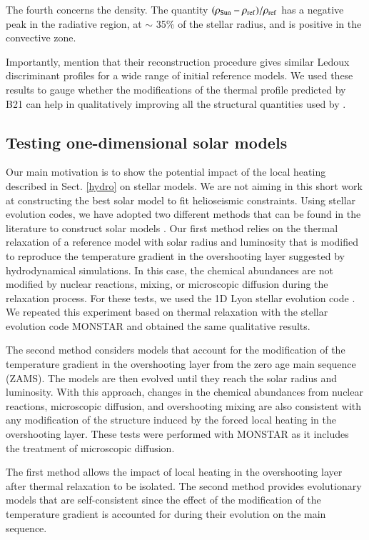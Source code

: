 \documentclass[traditabstract]{aa}
\newcommand{\3}{\ss}
\newcommand{\cp}{\citep}
\newcommand{\ct}{\citet}
\begin{document}
{The fourth concerns the density. The quantity $(\rho_{\rm Sun}-\rho_{\rm ref})/\rho_{\rm ref}$ has a negative peak in the radiative region, at $\sim$ 35\% of the stellar radius, and is positive in the convective zone. 

Importantly, \ct{buldgen20} mention that their reconstruction procedure gives  similar Ledoux discriminant profiles for a wide range of initial reference models. We used these results to gauge whether the modifications of the thermal profile  predicted by B21 can help in qualitatively improving all the structural quantities used by \ct{buldgen20}.


\subsection{Testing one-dimensional solar models}
\label{test1d}
Our main motivation is to show the potential  impact of the local heating 
described in Sect. \ref{hydro} on stellar models. We are not aiming in this short work at constructing the best solar model to fit helioseismic constraints.
Using stellar evolution codes, we have adopted two different methods that can be  found in the literature to construct solar models \cp[e.g.][]{zhang12, vinyoles17}.   
Our first method relies on the thermal relaxation of a reference model with solar radius and luminosity that is modified to reproduce the temperature gradient in the overshooting layer suggested by hydrodynamical simulations.  In this case, the chemical abundances are not modified by nuclear reactions, mixing, or microscopic diffusion during the relaxation process. For these tests, we used the 1D Lyon stellar evolution code \cp{baraffe98}. We repeated this experiment based on thermal relaxation with the stellar evolution code MONSTAR \cp[e.g.][]{constantino14} and obtained the same qualitative results.

The second method considers models that account for the modification of the temperature gradient in the overshooting layer from the zero age main sequence (ZAMS). The models are then evolved until they reach the solar radius and luminosity. With this approach, changes in the chemical abundances from nuclear reactions, microscopic diffusion, and overshooting mixing are  also consistent with any modification of the structure induced by the forced local heating in the overshooting layer. These tests 
 were performed with MONSTAR as it includes the treatment of microscopic diffusion.
 
 The first method allows the impact of local heating in the overshooting layer after thermal relaxation to be isolated. 
 The second method provides evolutionary models that are self-consistent since the effect of the modification of the temperature gradient is accounted for during their evolution on the main sequence. 

}
\end{document}

